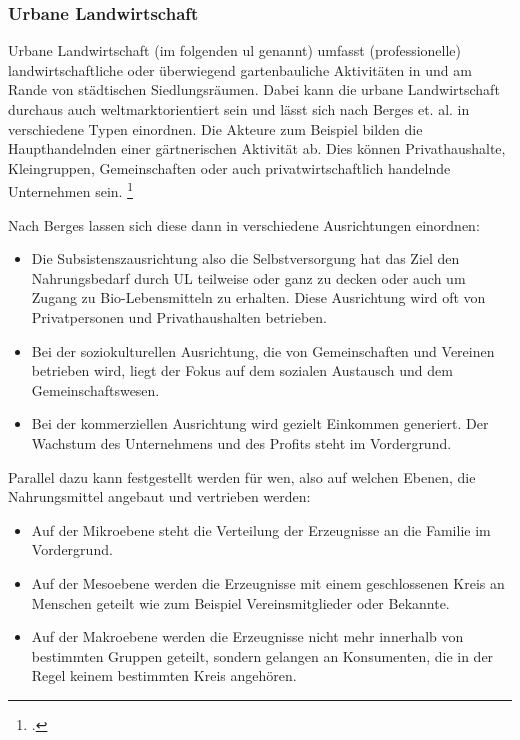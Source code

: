 \documentclass{scrartcl}
\begin{document}
\subsubsection[UL]{Urbane Landwirtschaft}
Urbane Landwirtschaft (im folgenden \acs{ul} genannt) umfasst (professionelle) landwirtschaftliche oder überwiegend gartenbauliche Aktivitäten in und am Rande von städtischen Siedlungsräumen. Dabei kann die urbane Landwirtschaft durchaus auch weltmarktorientiert sein und lässt sich nach Berges et. al. in verschiedene Typen einordnen. Die Akteure zum Beispiel bilden die Haupthandelnden einer gärtnerischen Aktivität ab. Dies können Privathaushalte, Kleingruppen, Gemeinschaften oder auch privatwirtschaftlich handelnde Unternehmen sein. \footcite[Vgl.][S. 10 f]{Berges2014UrbaneStadt}

Nach Berges lassen sich diese dann in verschiedene Ausrichtungen einordnen:

\begin{itemize}
\item Die Subsistenszausrichtung also die Selbstversorgung hat das Ziel den Nahrungsbedarf durch UL teilweise oder ganz zu decken oder auch um Zugang zu Bio-Lebensmitteln zu erhalten. Diese Ausrichtung wird oft von Privatpersonen und Privathaushalten betrieben. 
\item Bei der soziokulturellen Ausrichtung, die von Gemeinschaften und Vereinen betrieben wird, liegt der Fokus auf dem sozialen Austausch und dem Gemeinschaftswesen. 
\item Bei der kommerziellen Ausrichtung wird gezielt Einkommen generiert. Der Wachstum des Unternehmens und des Profits steht im Vordergrund. 
\end{itemize}

Parallel dazu kann festgestellt werden für wen, also auf welchen Ebenen, die Nahrungsmittel angebaut und vertrieben werden:

\begin{itemize}
\item Auf der Mikroebene steht die Verteilung der Erzeugnisse an die Familie im Vordergrund.
\item Auf der Mesoebene werden die Erzeugnisse mit einem geschlossenen Kreis an Menschen geteilt wie zum Beispiel Vereinsmitglieder oder Bekannte.
\item Auf der Makroebene werden die Erzeugnisse nicht mehr innerhalb von bestimmten Gruppen geteilt, sondern gelangen an Konsumenten, die in der Regel keinem bestimmten Kreis angehören. 
\end{itemize}
\end{document}
